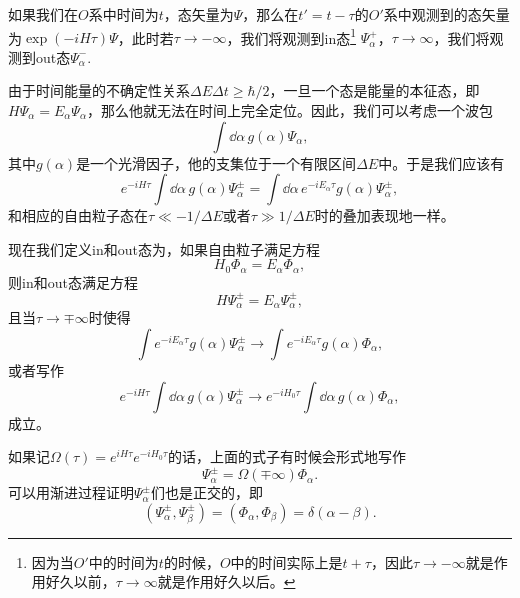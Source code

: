 如果我们在$O$系中时间为$t$，态矢量为$\Psi$，那么在$t'=t-\tau$的$O'$系中观测到的态矢量为$\exp(-iH\tau)\Psi$，此时若$\tau\to-\infty$，我们将观测到in态\footnote{因为当$O'$中的时间为$t$的时候，$O$中的时间实际上是$t+\tau$，因此$\tau\to -\infty$就是作用好久以前，$\tau\to \infty$就是作用好久以后。} $\Psi_\alpha^+$，$\tau\to\infty$，我们将观测到out态$\Psi_\alpha^-$.


由于时间能量的不确定性关系$\Delta E\Delta t\geq \hbar/2$，一旦一个态是能量的本征态，即$H\Psi_\alpha=E_\alpha \Psi_\alpha$，那么他就无法在时间上完全定位。因此，我们可以考虑一个波包
\[
\int \dd \alpha \, g(\alpha) \Psi_\alpha,
\]
其中$g(\alpha)$是一个光滑因子，他的支集位于一个有限区间$\Delta E$中。于是我们应该有
\[
	e^{-iH\tau}\int\dd \alpha\, g(\alpha) \Psi_\alpha^\pm=\int\dd \alpha\, e^{-iE_\alpha\tau}g(\alpha) \Psi_\alpha^\pm,
\]
和相应的自由粒子态在$\tau\ll -1/\Delta E$或者$\tau\gg 1/\Delta E$时的叠加表现地一样。

现在我们定义in和out态为，如果自由粒子满足方程
\[
H_0\Phi_\alpha=E_\alpha\Phi_\alpha,
\]
则in和out态满足方程
\[
H\Psi_\alpha^\pm=E_\alpha\Psi_\alpha^\pm,
\]
且当$\tau\to\mp\infty$时使得
\begin{equation}
\label{jianjinguanxi}
\int e^{-iE_\alpha\tau}g(\alpha) \Psi_\alpha^\pm \to \int e^{-iE_\alpha\tau}g(\alpha) \Phi_\alpha,
\end{equation}
或者写作
\[
e^{-iH\tau}\int\dd \alpha\, g(\alpha) \Psi_\alpha^\pm \to e^{-iH_0\tau}\int\dd \alpha\,g(\alpha) \Phi_\alpha,
\]
成立。

如果记$\Omega(\tau)=e^{iH\tau}e^{-iH_0\tau}$的话，上面的式子有时候会形式地写作
\[
\Psi_\alpha^\pm=\Omega(\mp \infty)\Phi_\alpha.
\]
可以用渐进过程证明$\Psi_\alpha^\pm$们也是正交的，即
\[
(\Psi_\alpha^\pm,\Psi_\beta^\pm)=(\Phi_\alpha,\Phi_\beta)=\delta(\alpha-\beta).
\]

